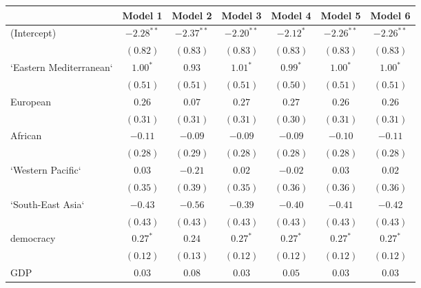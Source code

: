 
\begin{table}[!h]
\begin{center}
\begin{tabular}{l c c c c c c }
\toprule
 & Model 1 & Model 2 & Model 3 & Model 4 & Model 5 & Model 6 \\
\midrule
(Intercept)             & $-2.28^{**}$ & $-2.37^{**}$ & $-2.20^{**}$ & $-2.12^{*}$  & $-2.26^{**}$ & $-2.26^{**}$ \\
                        & $(0.82)$     & $(0.83)$     & $(0.83)$     & $(0.83)$     & $(0.83)$     & $(0.83)$     \\
`Eastern Mediterranean` & $1.00^{*}$   & $0.93$       & $1.01^{*}$   & $0.99^{*}$   & $1.00^{*}$   & $1.00^{*}$   \\
                        & $(0.51)$     & $(0.51)$     & $(0.51)$     & $(0.50)$     & $(0.51)$     & $(0.51)$     \\
European                & $0.26$       & $0.07$       & $0.27$       & $0.27$       & $0.26$       & $0.26$       \\
                        & $(0.31)$     & $(0.31)$     & $(0.31)$     & $(0.30)$     & $(0.31)$     & $(0.31)$     \\
African                 & $-0.11$      & $-0.09$      & $-0.09$      & $-0.09$      & $-0.10$      & $-0.11$      \\
                        & $(0.28)$     & $(0.29)$     & $(0.28)$     & $(0.28)$     & $(0.28)$     & $(0.28)$     \\
`Western Pacific`       & $0.03$       & $-0.21$      & $0.02$       & $-0.02$      & $0.03$       & $0.02$       \\
                        & $(0.35)$     & $(0.39)$     & $(0.35)$     & $(0.36)$     & $(0.36)$     & $(0.36)$     \\
`South-East Asia`       & $-0.43$      & $-0.56$      & $-0.39$      & $-0.40$      & $-0.41$      & $-0.42$      \\
                        & $(0.43)$     & $(0.43)$     & $(0.43)$     & $(0.43)$     & $(0.43)$     & $(0.43)$     \\
democracy               & $0.27^{*}$   & $0.24$       & $0.27^{*}$   & $0.27^{*}$   & $0.27^{*}$   & $0.27^{*}$   \\
                        & $(0.12)$     & $(0.13)$     & $(0.12)$     & $(0.12)$     & $(0.12)$     & $(0.12)$     \\
GDP                     & $0.03$       & $0.08$       & $0.03$       & $0.05$       & $0.03$       & $0.03$       \\

\end{tabular}
\end{center}
\end{table}
